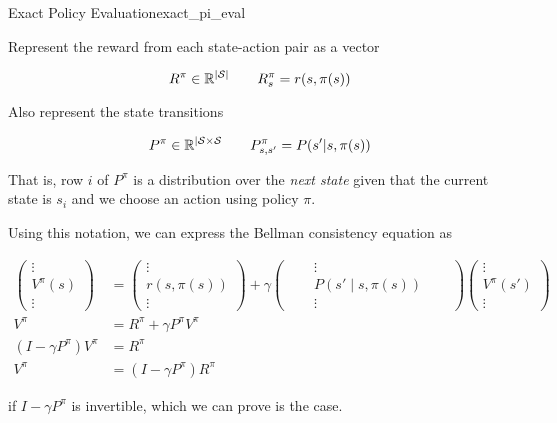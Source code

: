 \documentclass[../main/main]{subfiles}
\begin{document}
\begin{theorem}{Exact Policy Evaluation}{exact_pi_eval}

Represent the reward from each state-action pair as a vector

\[ R^\pi \in \mathbb{R}^{|\mathcal{S}|} \qquad R^\pi_s = r(s, \pi(s)) \]

Also represent the state transitions

\[ P^\pi \in \mathbb{R}^{|\mathcal{S} \times \mathcal{S}} \qquad P^\pi_{s, s'} = P(s' | s, \pi(s)) \]

That is, row $i$ of $P^\pi$ is a distribution over the \emph{next state}
given that the current state is $s_i$
and we choose an action using policy $\pi$.

Using this notation, we can express the Bellman consistency equation as

\begin{align*}
    \begin{pmatrix}
        \vdots \\ V^\pi(s) \\ \vdots
    \end{pmatrix}
    &=
    \begin{pmatrix}
        \vdots \\ r(s, \pi(s)) \\ \vdots
    \end{pmatrix}
    +
    \gamma
    \begin{pmatrix}
        & \vdots & \\
        \quad & P(s' \mid s, \pi(s)) & \quad \\
        & \vdots &
    \end{pmatrix}
    \begin{pmatrix}
        \vdots \\ V^\pi(s') \\ \vdots
    \end{pmatrix} \\
    V^\pi &= R^\pi + \gamma P^\pi V^\pi \\
    (I - \gamma P^\pi) V^\pi &= R^\pi \\
    V^\pi &= (I - \gamma P^\pi) R^\pi
\end{align*}

if $I - \gamma P^\pi$ is invertible, which we can prove is the case.


\end{theorem}
\end{document}
